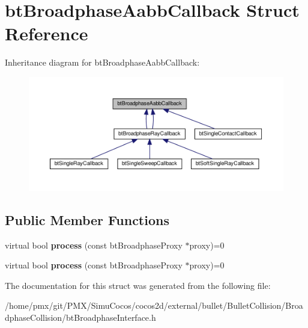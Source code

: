 \hypertarget{structbtBroadphaseAabbCallback}{}\section{bt\+Broadphase\+Aabb\+Callback Struct Reference}
\label{structbtBroadphaseAabbCallback}


Inheritance diagram for bt\+Broadphase\+Aabb\+Callback\+:
\nopagebreak
\begin{figure}[H]
\begin{center}
\leavevmode
\includegraphics[width=350pt]{structbtBroadphaseAabbCallback__inherit__graph}
\end{center}
\end{figure}
\subsection*{Public Member Functions}
\begin{DoxyCompactItemize}
\item 
\mbox{\label{structbtBroadphaseAabbCallback_a8e04a31537f0becf52cdeb8120a15cc8}} 
virtual bool {\bfseries process} (const bt\+Broadphase\+Proxy $\ast$proxy)=0
\item 
\mbox{\label{structbtBroadphaseAabbCallback_a8e04a31537f0becf52cdeb8120a15cc8}} 
virtual bool {\bfseries process} (const bt\+Broadphase\+Proxy $\ast$proxy)=0
\end{DoxyCompactItemize}


The documentation for this struct was generated from the following file\+:\begin{DoxyCompactItemize}
\item 
/home/pmx/git/\+P\+M\+X/\+Simu\+Cocos/cocos2d/external/bullet/\+Bullet\+Collision/\+Broadphase\+Collision/bt\+Broadphase\+Interface.\+h\end{DoxyCompactItemize}
